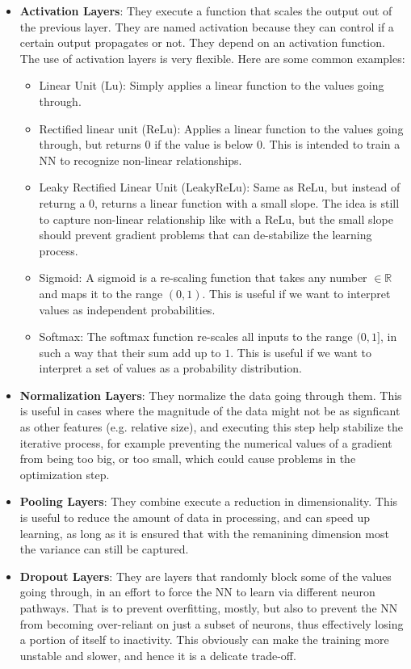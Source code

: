 \documentclass[a4paper, 11pt]{report}
\begin{document}
\begin{itemize}
    \item \textbf{Activation Layers}: They execute a function that scales the output out of the previous layer. They are named activation because they can control if a certain output propagates or not. They depend on an activation function. The use of activation layers is very flexible. Here are some common examples:
    \begin{itemize}
        \item Linear Unit (Lu): Simply applies a linear function to the values going through.
        \item Rectified linear unit (ReLu): Applies a linear function to the values going through, but returns 0 if the value is below 0. This is intended to train a NN to recognize non-linear relationships.
        \item Leaky Rectified Linear Unit (LeakyReLu): Same as ReLu, but instead of returng a 0, returns a linear function with a small slope. The idea is still to capture non-linear relationship like with a ReLu, but the small slope should prevent gradient problems that can de-stabilize the learning process.
        \item Sigmoid: A sigmoid is a re-scaling function that takes any number $\in \mathbb{R}$ and maps it to the range $(0, 1)$. This is useful if we want to interpret values as independent probabilities.
        \item Softmax: The softmax function re-scales all inputs to the range $(0,1]$, in such a way that their sum add up to $1$. This is useful if we want to interpret a set of values as a probability distribution.
    \end{itemize}
    \item \textbf{Normalization Layers}: They normalize the data going through them. This is useful in cases where the magnitude of the data might not be as signficant as other features (e.g. relative size), and executing this step help stabilize the iterative process, for example preventing the numerical values of a gradient from being too big, or too small, which could cause problems in the optimization step.
    \item \textbf{Pooling Layers}: They combine execute a reduction in dimensionality. This is useful to reduce the amount of data in processing, and can speed up learning, as long as it is ensured that with the remanining dimension most the variance can still be captured.
    \item \textbf{Dropout Layers}: They are layers that randomly block some of the values going through, in an effort to force the NN to learn via different neuron pathways. That is to prevent overfitting, mostly, but also to prevent the NN from becoming over-reliant on just a subset of neurons, thus effectively losing a portion of itself to inactivity. This obviously can make the training more unstable and slower, and hence it is a delicate trade-off.
\end{itemize}
\end{document}
